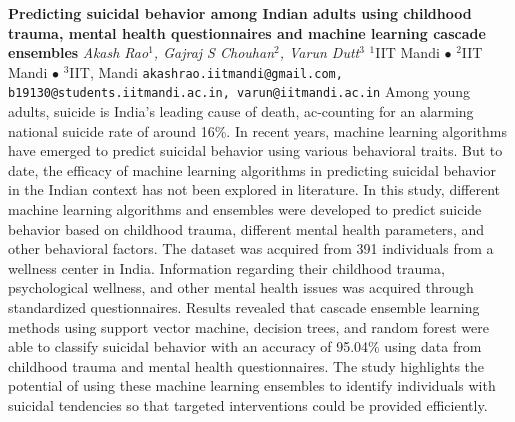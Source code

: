 
    \begin{conf-abstract}[]
        {\textbf{Predicting suicidal behavior among Indian adults using childhood trauma, mental health questionnaires and machine learning cascade ensembles}}
        {\textit{Akash Rao$^{1}$, Gajraj S Chouhan$^{2}$, Varun Dutt$^{3}$}}
        {$^{1}$IIT Mandi $\bullet$ $^{2}$IIT Mandi $\bullet$ $^{3}$IIT, Mandi}
        {\texttt{akashrao.iitmandi@gmail.com, b19130@students.iitmandi.ac.in, varun@iitmandi.ac.in}}
        {Among young adults, suicide is India's leading cause of death, ac-counting for an alarming national suicide rate of around 16\%. In recent years, machine learning algorithms have emerged to predict suicidal behavior using various behavioral traits. But to date, the efficacy of machine learning algorithms in predicting suicidal behavior in the Indian context has not been explored in literature. In this study, different machine learning algorithms and ensembles were developed to predict suicide behavior based on childhood trauma, different mental health parameters, and other behavioral factors. The dataset was acquired from 391 individuals from a wellness center in India. Information regarding their childhood trauma, psychological wellness, and other mental health issues was acquired through standardized questionnaires. Results revealed that cascade ensemble learning methods using support vector machine, decision trees, and random forest were able to classify suicidal behavior with an accuracy of 95.04\% using data from childhood trauma and mental health questionnaires. The study highlights the potential of using these machine learning ensembles to identify individuals with suicidal tendencies so that targeted interventions could be provided efficiently.}
    \end{conf-abstract}
        